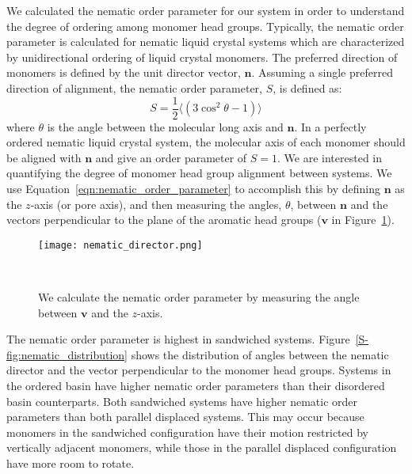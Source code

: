   We calculated the nematic order parameter for our system in order to
  understand the degree of ordering among monomer head groups. Typically, the
  nematic order parameter is calculated for nematic liquid crystal systems which
  are characterized by unidirectional ordering of liquid crystal monomers. The
  preferred direction of monomers is defined by the unit director vector,
  $\mathbf{n}$. Assuming a single preferred direction of alignment, the nematic
  order parameter, $S$, is defined as:~\cite{chaikin_principles_1995}
  \begin{equation}
	 S = \frac{1}{2} \langle(3\cos^2\theta -1)\rangle
	\label{eqn:nematic_order_parameter}
  \end{equation}
  where $\theta$ is the angle between the molecular long axis and $\mathbf{n}$.
  In a perfectly ordered nematic liquid crystal system, the molecular axis of each
  monomer should be aligned with $\mathbf{n}$ and give an order parameter of $S=1$. 
  We are interested in quantifying the degree of monomer head group alignment 
  between systems. We use Equation~\ref{eqn:nematic_order_parameter} to accomplish this
  by defining $\mathbf{n}$ as the $z$-axis (or pore axis), and then measuring the angles,
  $\theta$, between $\mathbf{n}$ and the vectors perpendicular to the plane of
  the aromatic head groups ($\mathbf{v}$ in Figure~\ref{S-fig:director}). 
  
  \begin{figure}[!htb]
  \centering
  \texttt{[image: nematic\_director.png]}
  \caption{We calculate the nematic order parameter by measuring the angle
  between $\mathbf{v}$ and the $z$-axis.}~\label{S-fig:director}
  \end{figure}

  The nematic order parameter is highest in sandwiched systems. 
  Figure~\ref{S-fig:nematic_distribution} shows the distribution of angles between
  the nematic director and the vector perpendicular to the monomer head groups. 
  Systems in the ordered basin have higher nematic order parameters than their
  disordered basin counterparts. Both sandwiched systems have higher nematic order
  parameters than both parallel displaced systems. This may occur because monomers
  in the sandwiched configuration have their motion restricted by vertically adjacent
  monomers, while those in the parallel displaced configuration have more room to 
  rotate.
  
  \clearpage

